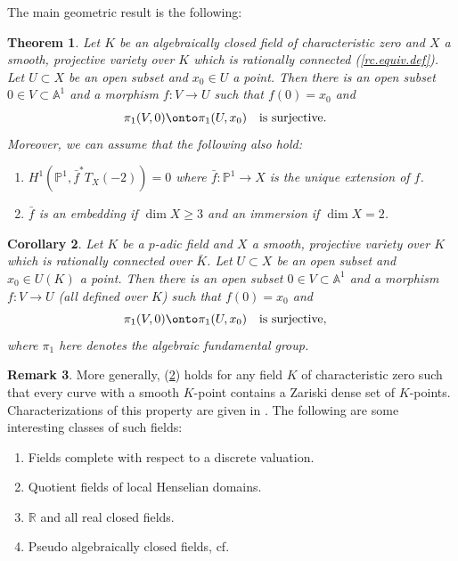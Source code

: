 \documentclass[12pt,twoside]{amsart}
\renewcommand{\r}[0]{{\mathbb R}}
\renewcommand{\a}[0]{{\mathbb A}}
\newcommand{\p}[0]{{\mathbb P}}
\newcommand{\qtq}[1]{\quad\mbox{#1}\quad}
\newtheorem{thm}{Theorem}[section]
\newtheorem{cor}[thm]{Corollary}
\theoremstyle{definition}
\newtheorem{rem}[thm]{Remark}
\theoremstyle{remark}
\begin{document}
  


The main geometric result is the following:


\begin{thm}\label{main.thm}
 Let $K$ be an algebraically closed field of characteristic zero
and  $X$ a smooth, projective variety over $K$
which is  rationally connected  (\ref{rc.equiv.def}).
Let $U\subset X$ be an open subset and $x_0\in U$ a point. 
Then there is an open
 subset $0\in V\subset \a^1$ and a morphism $f:V\to U$ such 
that $f(0)=x_0$ and
$$
\pi_1(V,0)\onto \pi_1(U,x_0)\qtq{is surjective.}
$$
Moreover, we can  assume that the following also hold:
\begin{enumerate}
\item $H^1(\p^1, \bar f^*T_X(-2))=0$ where $\bar f:\p^1\to X$ is the unique
 extension of $f$.
 \item $\bar f$ is an embedding if $\dim X\geq  3$ and an
 immersion if $\dim X=2$.
 \end{enumerate}
\end{thm}



\begin{cor}\label{main.cor}
 Let $K$ be a $p$-adic  field 
and  $X$ a smooth, projective variety over $K$ which is 
rationally connected  over
 $\bar K$.
Let $U\subset X$ be an open subset and $x_0\in U(K)$ a point. Then 
there is an open
 subset $0\in V\subset \a^1$ and a morphism $f:V\to U$ 
 (all defined over $K$) such that $f(0)=x_0$ and
$$
\pi_1 (V,0)\onto \pi_1 (U,x_0)\qtq{is surjective,}
$$
where $\pi_1$ here denotes the algebraic fundamental group.
\end{cor}


\begin{rem}\label{large.field.defn}
 More generally, (\ref{main.cor}) holds for any field $K$
of characteristic zero
 such that every curve with a smooth
$K$-point contains a Zariski dense set of $K$-points.
Characterizations of this property are
given in \cite[1.1]{pop}.
The following
are some interesting classes of such fields:
\begin{enumerate}
\item Fields complete with respect to a discrete valuation.
\item Quotient fields of   local Henselian domains.
\item $\r$ and all real closed fields.
\item Pseudo algebraically closed fields, cf.\ \cite[Chap.\
10]{fj86}
\end{enumerate}
\end{rem}
\end{document}
